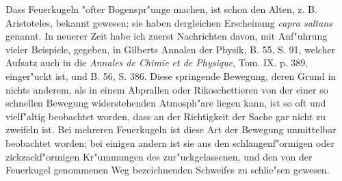 \documentclass[a4paper, 11pt, oneside, polutonikogreek, german]{article}
\begin{document}
Dass Feuerkugeln "ofter Bogenspr"unge machen, ist schon den Alten, z. B. Aristoteles, bekannt gewesen; sie haben dergleichen Erscheinung \emph{capra saltans} genannt. In neuerer Zeit habe ich zuerst Nachrichten davon, mit Anf"uhrung vieler Beispiele, gegeben, in Gilberts Annalen der Physik, B. 55, S. 91, welcher Aufsatz auch in die \emph{Annales de Chimie et de Physique}, Tom. IX. p. 389, einger"uckt ist, und B. 56, S. 386. Diese springende Bewegung, deren Grund in nichts anderem, als in einem Abprallen oder Rikoschettieren von der einer so schnellen Bewegung widerstehenden Atmosph"are liegen kann, ist so oft und vielf"altig beobachtet worden, dass an der Richtigkeit der Sache gar nicht zu zweifeln ist. Bei mehreren Feuerkugeln ist diese Art der Bewegung unmittelbar beobachtet worden; bei einigen andern ist sie aus den schlangenf"ormigen oder zickzackf"ormigen Kr"ummungen des zur"uckgelassenen, und den von der Feuerkugel genommenen Weg bezeichnenden Schweifes zu schlie"sen gewesen.
\end{document}
